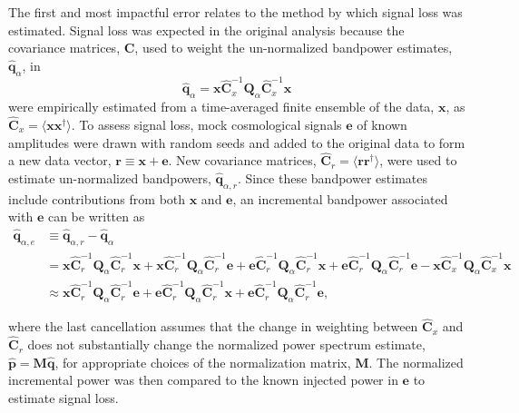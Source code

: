 \documentclass[onecolumn]{emulateapj} \shorttitle{}
\begin{document}
The first and most impactful error relates to the method by which signal loss was estimated.
Signal loss was expected in the original analysis because the covariance matrices, $\textbf{C}$,
used to weight the un-normalized bandpower estimates, ${\widehat{\textbf{q}}}_\alpha$, in
\begin{equation}
{\widehat{\textbf{q}}}_{\alpha} = {\mathbf x}\widehat{\textbf{C}}_{x}^{-1}\textbf{Q}_\alpha \widehat{\textbf{C}}_{x}^{-1}{\mathbf x}
\end{equation} 
were empirically estimated from a time-averaged finite ensemble of the data, $\mathbf x$, as $\widehat{\textbf{C}}_{x}=\langle {\mathbf x} {\mathbf x}^\dagger\rangle$.
To assess signal loss, mock cosmological signals $\mathbf e$ of known amplitudes were 
drawn with random seeds and added to the original data to form a new data vector, ${\mathbf r}\equiv{\mathbf x} + {\mathbf e}$.
New covariance matrices, $\widehat{\textbf{C}}_r=\langle{\mathbf r}\mathbf{r}^\dagger\rangle$, were used to estimate un-normalized bandpowers, 
${\widehat{\textbf{q}}}_{\alpha,r}$. Since these bandpower estimates include contributions from both $\mathbf x$ and $\mathbf e$,
an incremental bandpower associated with $\mathbf e$ can be written as
\begin{align}
{\widehat{\textbf{q}}}_{\alpha,e}&\equiv{\widehat{\textbf{q}}}_{\alpha,r}-{\widehat{\textbf{q}}}_{\alpha} \\
&=
{\mathbf x}\widehat{\textbf{C}}_r^{-1}\textbf{Q}_\alpha \widehat{\textbf{C}}_r^{-1}{\mathbf x}+
{\mathbf x}\widehat{\textbf{C}}_r^{-1}\textbf{Q}_\alpha \widehat{\textbf{C}}_r^{-1}{\mathbf e}+
{\mathbf e}\widehat{\textbf{C}}_r^{-1}\textbf{Q}_\alpha \widehat{\textbf{C}}_r^{-1}{\mathbf x}+
{\mathbf e}\widehat{\textbf{C}}_r^{-1}\textbf{Q}_\alpha \widehat{\textbf{C}}_r^{-1}{\mathbf e}
- {\mathbf x}\widehat{\textbf{C}}_x^{-1}\textbf{Q}_\alpha \widehat{\textbf{C}}_x^{-1}{\mathbf x} \\
&\approx
{\mathbf x}\widehat{\textbf{C}}_r^{-1}\textbf{Q}_\alpha \widehat{\textbf{C}}_r^{-1}{\mathbf e}+
{\mathbf e}\widehat{\textbf{C}}_r^{-1}\textbf{Q}_\alpha \widehat{\textbf{C}}_r^{-1}{\mathbf x}+
{\mathbf e}\widehat{\textbf{C}}_r^{-1}\textbf{Q}_\alpha \widehat{\textbf{C}}_r^{-1}{\mathbf e},
\label{eq:crossterms}
\end{align}

where the last cancellation assumes that the change in weighting between $\widehat{\textbf{C}}_{x}$ and $\widehat{\textbf{C}}_r$ does not substantially change
the normalized power spectrum estimate, $\widehat{\textbf{p}}=\textbf{M}\widehat{\textbf{q}}$, for appropriate choices of the normalization matrix, $\textbf{M}$.
The normalized incremental power was then compared to the known injected power in $\mathbf e$ to estimate signal loss.
\end{document}
